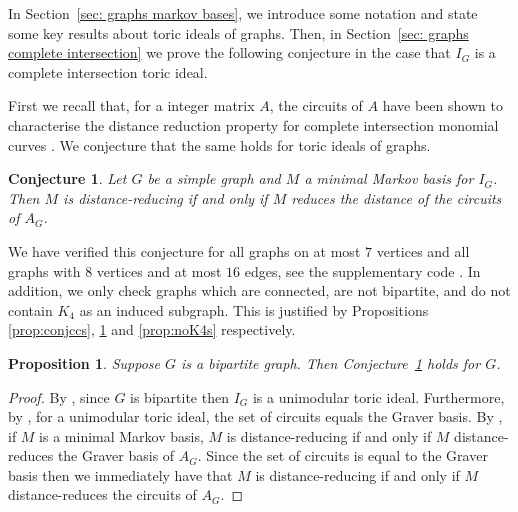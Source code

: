 \documentclass[a4paper, 12pt]{article}
\theoremstyle{plain}
\newtheorem{proposition}[theorem]{Proposition}
\newtheorem{conjecture}[theorem]{Conjecture}
\theoremstyle{definition}
\theoremstyle{remark}
\begin{document}
In Section~\ref{sec: graphs markov bases}, we introduce some notation and state some key results about toric ideals of graphs.
Then, in Section~\ref{sec: graphs complete intersection} we prove the following conjecture in the case that $I_G$ is a complete intersection toric ideal.


First we recall that, for a integer matrix $A$, the circuits of $A$ have been shown to characterise the distance reduction property for complete intersection monomial curves \cite[Corollary~5.2]{CK_2024}. We conjecture that the same holds for toric ideals of graphs.


\begin{conjecture}\label{conj: distance reduction for graph ideals by circuits}
    Let $G$ be a simple graph and $M$ a minimal Markov basis for $I_G$. Then $M$ is distance-reducing if and only if $M$ reduces the distance of the circuits of $A_G$.
\end{conjecture}

We have verified this conjecture for all graphs on at most $7$ vertices and all graphs with $8$ vertices and at most $16$ edges, see the supplementary code \cite{githubM2DistanceReduction}.
In addition, we only check graphs which are connected, are not bipartite, and do not contain $K_4$ as an induced subgraph. This is justified by Propositions \ref{prop:conjccs}, \ref{prop:nobipartite} and \ref{prop:noK4s} respectively.



\begin{proposition} \label{prop:nobipartite}
Suppose $G$ is a bipartite graph. Then Conjecture~\ref{conj: distance reduction for graph ideals by circuits} holds for $G$. 
\end{proposition}

\begin{proof}
    By \cite[Theorem 3.13]{tatakis2025unimodulartoricidealsgraphs}, since $G$ is bipartite then $I_G$ is a unimodular toric ideal. Furthermore, by \cite[Proposition 8.18]{sturmfels1996grobner}, for a unimodular toric ideal, the set of circuits equals the Graver basis. By \cite[Theorem 7.4]{CK_2024}, if $M$ is a minimal Markov basis, $M$ is distance-reducing if and only if $M$ distance-reduces the Graver basis of $A_G$. Since the set of circuits is equal to the Graver basis then we immediately have that $M$ is distance-reducing if and only if $M$ distance-reduces the circuits of $A_G$.
\end{proof}
\end{document}
